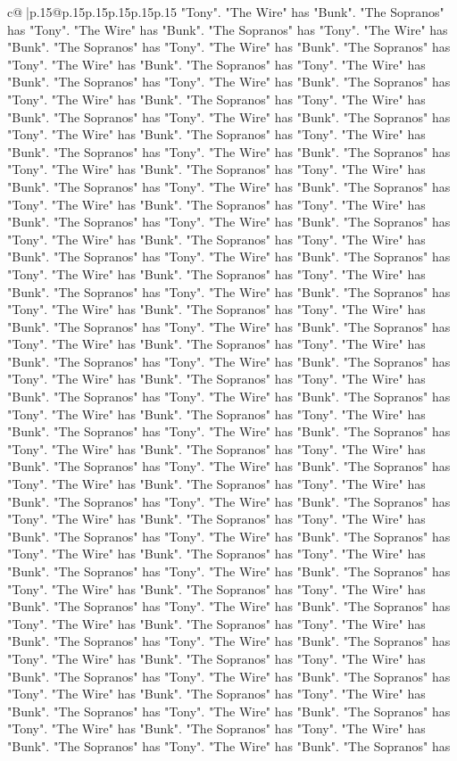 \documentclass{article}
\begin{document}
{\begin{supertabular}{c@{$\;$}|p{.15\linewidth}@{}p{.15\linewidth}p{.15\linewidth}p{.15\linewidth}p{.15\linewidth}p{.15\linewidth}}
{{{"Tony". "The Wire" has "Bunk". "The Sopranos" has "Tony". "The Wire" has "Bunk". "The Sopranos" has "Tony". "The Wire" has "Bunk". "The Sopranos" has "Tony". "The Wire" has "Bunk". "The Sopranos" has "Tony". "The Wire" has "Bunk". "The Sopranos" has "Tony". "The Wire" has "Bunk". "The Sopranos" has "Tony". "The Wire" has "Bunk". "The Sopranos" has "Tony". "The Wire" has "Bunk". "The Sopranos" has "Tony". "The Wire" has "Bunk". "The Sopranos" has "Tony". "The Wire" has "Bunk". "The Sopranos" has "Tony". "The Wire" has "Bunk". "The Sopranos" has "Tony". "The Wire" has "Bunk". "The Sopranos" has "Tony". "The Wire" has "Bunk". "The Sopranos" has "Tony". "The Wire" has "Bunk". "The Sopranos" has "Tony". "The Wire" has "Bunk". "The Sopranos" has "Tony". "The Wire" has "Bunk". "The Sopranos" has "Tony". "The Wire" has "Bunk". "The Sopranos" has "Tony". "The Wire" has "Bunk". "The Sopranos" has "Tony". "The Wire" has "Bunk". "The Sopranos" has "Tony". "The Wire" has "Bunk". "The Sopranos" has "Tony". "The Wire" has "Bunk". "The Sopranos" has "Tony". "The Wire" has "Bunk". "The Sopranos" has "Tony". "The Wire" has "Bunk". "The Sopranos" has "Tony". "The Wire" has "Bunk". "The Sopranos" has "Tony". "The Wire" has "Bunk". "The Sopranos" has "Tony". "The Wire" has "Bunk". "The Sopranos" has "Tony". "The Wire" has "Bunk". "The Sopranos" has "Tony". "The Wire" has "Bunk". "The Sopranos" has "Tony". "The Wire" has "Bunk". "The Sopranos" has "Tony". "The Wire" has "Bunk". "The Sopranos" has "Tony". "The Wire" has "Bunk". "The Sopranos" has "Tony". "The Wire" has "Bunk". "The Sopranos" has "Tony". "The Wire" has "Bunk". "The Sopranos" has "Tony". "The Wire" has "Bunk". "The Sopranos" has "Tony". "The Wire" has "Bunk". "The Sopranos" has "Tony". "The Wire" has "Bunk". "The Sopranos" has "Tony". "The Wire" has "Bunk". "The Sopranos" has "Tony". "The Wire" has "Bunk". "The Sopranos" has "Tony". "The Wire" has "Bunk". "The Sopranos" has "Tony". "The Wire" has "Bunk". "The Sopranos" has "Tony". "The Wire" has "Bunk". "The Sopranos" has "Tony". "The Wire" has "Bunk". "The Sopranos" has "Tony". "The Wire" has "Bunk". "The Sopranos" has "Tony". "The Wire" has "Bunk". "The Sopranos" has "Tony". "The Wire" has "Bunk". "The Sopranos" has "Tony". "The Wire" has "Bunk". "The Sopranos" has "Tony". "The Wire" has "Bunk". "The Sopranos" has "Tony". "The Wire" has "Bunk". "The Sopranos" has "Tony". "The Wire" has "Bunk". "The Sopranos" has "Tony". "The Wire" has "Bunk". "The Sopranos" has "Tony". "The Wire" has "Bunk". "The Sopranos" has "Tony". "The Wire" has "Bunk". "The Sopranos" has "Tony". "The Wire" has "Bunk". "The Sopranos" has "Tony". "The Wire" has "Bunk". "The Sopranos" has "Tony". "The Wire" has "Bunk". "The Sopranos" has "Tony". "The Wire" has "Bunk". "The Sopranos" has "Tony". "The Wire" has "Bunk". "The Sopranos" has "Tony". "The Wire" has "Bunk". "The Sopranos" has "Tony". "The Wire" has "Bunk". "The Sopranos" has "Tony". "The Wire" has "Bunk". "The Sopranos" has "Tony". "The Wire" has "Bunk". "The Sopranos" has "Tony". "The Wire" has "Bunk". "The Sopranos" has "Tony". "The Wire" has "Bunk". "The Sopranos" has "Tony". "The Wire" has "Bunk". "The Sopranos" has }}}
\end{supertabular}}
\end{document}
